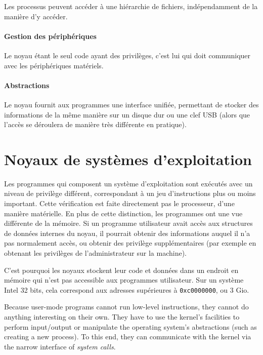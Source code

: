 Les processus peuvent accéder à une hiérarchie de fichiers, indépendamment de la
manière d'y accéder.

\paragraph{Gestion des périphériques}

Le noyau étant le seul code ayant des privilèges, c'est lui qui doit communiquer
avec les périphériques matériels.

\paragraph{Abstractions}

Le noyau fournit aux programmes une interface unifiée, permettant de stocker des
informations de la même manière sur un disque dur ou une clef USB (alors que
l'accès se déroulera de manière très différente en pratique).

\section{Noyaux de systèmes d'exploitation}


Les programmes qui composent un système d'exploitation sont exécutés avec un
niveau de privilège différent, correspondant à un jeu d'instructions plus ou
moins important. Cette vérification est faite directement pas le processeur,
d'une manière matérielle. En plus de cette distinction, les programmes ont une
vue différente de la mémoire. Si un programme utilisateur avait accès aux
structures de données internes du noyau, il pourrait obtenir des informations
auquel il n'a pas normalement accès, ou obtenir des privilège supplémentaires
(par exemple en obtenant les privilèges de l'administrateur sur la machine).

C'est pourquoi les noyaux stockent leur code et données dans un endroit en
mémoire qui n'est pas accessible aux programmes utilisateur. Sur un système
Intel 32 bits, cela correspond aux adresses supérieures à \texttt{0xc0000000},
ou 3 Gio.


Because user-mode programs cannot run low-level instructions, they cannot do
anything interesting on their own. They have to use the kernel's facilities to
perform input/output or manipulate the operating system's abstractions (such as
creating a new process). To this end, they can communicate with the kernel
via the narrow interface of \emph{system calls}.

